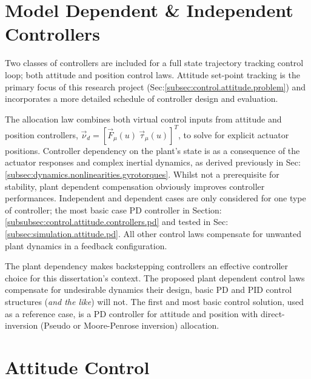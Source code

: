 \section{Model Dependent \& Independent Controllers}
Two classes of controllers are included for a full state trajectory tracking control loop; both attitude and position control laws. Attitude set-point tracking is the primary focus of this research project (Sec:\ref{subsec:control.attitude.problem}) and incorporates a more detailed schedule of controller design and evaluation. 
\par
The allocation law combines both virtual control inputs from attitude and position controllers, $\vec{\nu}_d=[\vec{F}_\mu(u)~\vec{\tau}_\mu(u)]^T$, to solve for explicit actuator positions. Controller dependency on the plant's state is as a consequence of the actuator responses and complex inertial dynamics, as derived previously in Sec:\ref{subsec:dynamics.nonlinearities.gyrotorques}. Whilst not a prerequisite for stability, plant dependent compensation obviously improves controller performances. Independent and dependent cases are only considered for one type of controller; the most basic case PD controller in Section:\ref{subsubsec:control.attitude.controllers.pd} and tested in Sec:\ref{subsec:simulation.attitude.pd}. All other control laws compensate for unwanted plant dynamics in a feedback configuration.
\par
The plant dependency makes backstepping controllers an effective controller choice for this dissertation's context. The proposed plant dependent control laws compensate for undesirable dynamics their design, basic PD and PID control structures (\emph{and the like}) will not. The first and most basic control solution, used as a reference case, is a PD controller for attitude and position with direct-inversion (Pseudo or Moore-Penrose inversion) allocation. 
\section{Attitude Control}
\label{sec:control.attitude}
